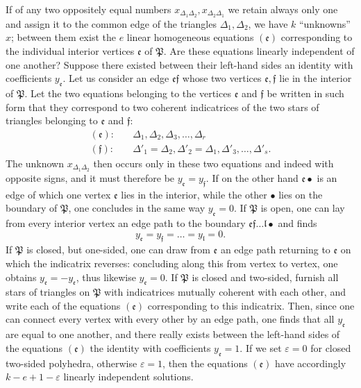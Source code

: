 \documentclass{article}
\begin{document}
If of any two oppositely equal numbers $x_{\Delta_1 \Delta_2}, x_{\Delta_2 \Delta_1}$ we retain always only one and assign it to the common edge of the triangles $\Delta_1, \Delta_2$, we have $k$ ``unknowns'' $x$; between them exist the $e$ linear homogeneous equations $(\mathfrak{e})$ corresponding to the individual interior vertices $\mathfrak{e}$ of $\mathfrak{P}$. Are these equations linearly independent of one another? Suppose there existed between their left-hand sides an identity with coefficients $y_{\mathfrak{e}}$. Let us consider an edge $\mathfrak{e}\mathfrak{f}$ whose two vertices $\mathfrak{e}, \mathfrak{f}$ lie in the interior of $\mathfrak{P}$. Let the two equations belonging to the vertices $\mathfrak{e}$ and $\mathfrak{f}$ be written in such form that they correspond to two coherent indicatrices of the two stars of triangles belonging to $\mathfrak{e}$ and $\mathfrak{f}$:
\[ \begin{aligned} (\mathfrak{e})\colon & \quad \Delta_1, \Delta_2, \Delta_3, \dots, \Delta_r \\ (\mathfrak{f})\colon & \quad \Delta'_1 = \Delta_2, \Delta'_2 = \Delta_1, \Delta'_3, \dots, \Delta'_s. \end{aligned} \]
The unknown $x_{\Delta_1 \Delta_2}$ then occurs only in these two equations and indeed with opposite signs, and it must therefore be $y_{\mathfrak{e}} = y_{\mathfrak{f}}$. If on the other hand $\mathfrak{e}\bullet$ is an edge of which one vertex $\mathfrak{e}$ lies in the interior, while the other $\bullet$ lies on the boundary of $\mathfrak{P}$, one concludes in the same way $y_{\mathfrak{e}} = 0$. If $\mathfrak{P}$ is open, one can lay from every interior vertex an edge path to the boundary $\mathfrak{e}\mathfrak{f}\dots\mathfrak{l}\bullet$ and finds
\[ y_{\mathfrak{e}} = y_{\mathfrak{f}} = \dots = y_{\mathfrak{l}} = 0. \]
If $\mathfrak{P}$ is closed, but one-sided, one can draw from $\mathfrak{e}$ an edge path returning to $\mathfrak{e}$ on which the indicatrix reverses: concluding along this from vertex to vertex, one obtains $y_{\mathfrak{e}} = - y_{\mathfrak{e}}$, thus likewise $y_{\mathfrak{e}} = 0$. If $\mathfrak{P}$ is closed and two-sided, furnish all stars of triangles on $\mathfrak{P}$ with indicatrices mutually coherent with each other, and write each of the equations $(\mathfrak{e})$ corresponding to this indicatrix. Then, since one can connect every vertex with every other by an edge path, one finds that all $y_{\mathfrak{e}}$ are equal to one another, and there really exists between the left-hand sides of the equations $(\mathfrak{e})$ the identity with coefficients $y_{\mathfrak{e}} = 1$. If we set $\varepsilon = 0$ for closed two-sided polyhedra, otherwise $\varepsilon = 1$, then the equations $(\mathfrak{e})$ have accordingly $k - e + 1 - \varepsilon$ linearly independent solutions.
\end{document}
